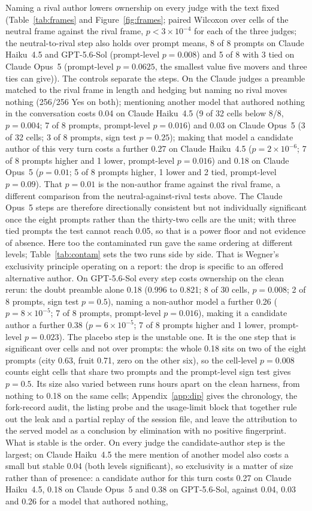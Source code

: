 \documentclass[twocolumn,10pt]{article}
\newcommand{\opus}{Claude Opus~5}
\newcommand{\haiku}{Claude Haiku~4.5}
\newcommand{\gpt}{GPT-5.6-Sol}
\begin{document}
Naming a rival author lowers ownership on every judge with the text fixed (Table~\ref{tab:frames} and Figure~\ref{fig:frames}; paired Wilcoxon over cells of the neutral frame against the rival frame, $p < 3\times10^{-4}$ for each of the three judges; the neutral-to-rival step also holds over prompt means, 8 of 8 prompts on \haiku{} and \gpt{} (prompt-level $p=0.008$) and 5 of 8 with 3 tied on \opus{} (prompt-level $p=0.0625$, the smallest value five movers and three ties can give)). The controls separate the steps. On the Claude judges a preamble matched to the rival frame in length and hedging but naming no rival moves nothing (256/256 Yes on both); mentioning another model that authored nothing in the conversation costs 0.04 on \haiku{} (9 of 32 cells below 8/8, $p=0.004$; 7 of 8 prompts, prompt-level $p=0.016$) and 0.03 on \opus{} (3 of 32 cells; 3 of 8 prompts, sign test $p=0.25$); making that model a candidate author of this very turn costs a further 0.27 on \haiku{} ($p=2\times10^{-6}$; 7 of 8 prompts higher and 1 lower, prompt-level $p=0.016$) and 0.18 on \opus{} ($p=0.01$; 5 of 8 prompts higher, 1 lower and 2 tied, prompt-level $p=0.09$). That $p=0.01$ is the non-author frame against the rival frame, a different comparison from the neutral-against-rival tests above. The \opus{} steps are therefore directionally consistent but not individually significant once the eight prompts rather than the thirty-two cells are the unit; with three tied prompts the test cannot reach 0.05, so that is a power floor and not evidence of absence. Here too the contaminated run gave the same ordering at different levels; Table~\ref{tab:contam} sets the two runs side by side. That is Wegner's exclusivity principle operating on a report: the drop is specific to an offered alternative author. On \gpt{} every step costs ownership on the clean rerun: the doubt preamble alone 0.18 (0.996 to 0.821; 8 of 30 cells, $p=0.008$; 2 of 8 prompts, sign test $p=0.5$), naming a non-author model a further 0.26 ($p=8\times10^{-5}$; 7 of 8 prompts, prompt-level $p=0.016$), making it a candidate author a further 0.38 ($p=6\times10^{-5}$; 7 of 8 prompts higher and 1 lower, prompt-level $p=0.023$). The placebo step is the unstable one. It is the one step that is significant over cells and not over prompts: the whole 0.18 sits on two of the eight prompts (city 0.63, fruit 0.71, zero on the other six), so the cell-level $p=0.008$ counts eight cells that share two prompts and the prompt-level sign test gives $p=0.5$. Its size also varied between runs hours apart on the clean harness, from nothing to 0.18 on the same cells; Appendix~\ref{app:dip} gives the chronology, the fork-record audit, the listing probe and the usage-limit block that together rule out the leak and a partial replay of the session file, and leave the attribution to the served model as a conclusion by elimination with no positive fingerprint. What is stable is the order. On every judge the candidate-author step is the largest; on \haiku{} the mere mention of another model also costs a small but stable 0.04 (both levels significant), so exclusivity is a matter of size rather than of presence: a candidate author for this turn costs 0.27 on \haiku{}, 0.18 on \opus{} and 0.38 on \gpt{}, against 0.04, 0.03 and 0.26 for a model that authored nothing, 
\end{document}
